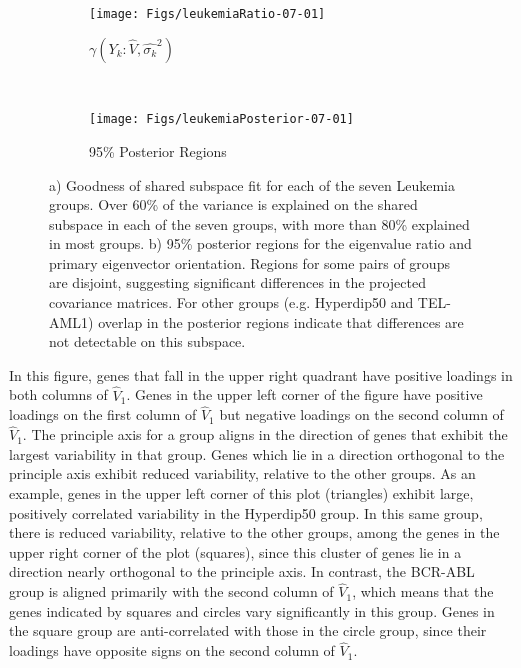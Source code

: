 \documentclass[12pt]{article}
\begin{document}
\begin{figure}[t]
    \centering
    \begin{subfigure}[b]{0.45\textwidth}
        \texttt{[image: Figs/leukemiaRatio-07-01]}
        \caption{$\gamma(Y_k: \hat{V}, \hat{\sigma_k}^2)$}
        \label{fig:leukemiaRatio}
    \end{subfigure}
    ~ %
    \begin{subfigure}[b]{0.45\textwidth}
        \texttt{[image: Figs/leukemiaPosterior-07-01]}
        \caption{95\% Posterior Regions }
        \label{fig:leukemiaPosterior}
      \end{subfigure}
      \caption{a) Goodness of shared subspace fit for each of the
        seven Leukemia groups.  Over 60\% of the variance is explained
        on the shared subspace in each of the seven groups, with
        more than 80\% explained in most groups.  b) 95\% posterior
        regions for the eigenvalue ratio and primary eigenvector
        orientation.  Regions for some pairs of groups are disjoint,
        suggesting significant differences in the projected covariance
        matrices.  For other groups (e.g. Hyperdip50 and TEL-AML1)
        overlap in the posterior regions indicate that differences are
        not detectable on this subspace. }
\label{fig:leukemia}
\end{figure}

In this figure, genes that fall in the upper right quadrant have
positive loadings in both columns of $\hat{V}_1$. Genes in the upper left
corner of the figure have positive loadings on the first column of $\hat{V}_1$
but negative loadings on the second column of $\hat{V}_1$.  The principle axis
for a group aligns in the direction of genes that exhibit the largest
variability in that group.  Genes which lie in a direction orthogonal
to the principle axis exhibit reduced variability, relative to the
other groups. As an example, genes in the upper left corner of this
plot (triangles) exhibit large, positively correlated variability in
the Hyperdip50 group.  In this same group, there is reduced
variability, relative to the other groups, among the genes in the
upper right corner of the plot (squares), since this cluster of genes lie in
a direction nearly orthogonal to the principle axis.  In contrast, the
BCR-ABL group is aligned primarily with the second column of $\hat{V}_1$,
which means that the genes indicated by squares and circles vary
significantly in this group.  Genes in the square group are
anti-correlated with those in the circle group, since their
loadings have opposite signs on the second column of $\hat{V}_1$.
\end{document}
